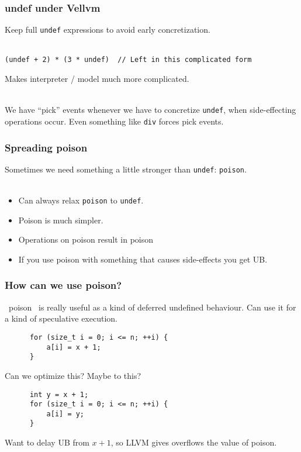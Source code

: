 \documentclass[handout]{beamer}
\begin{document}
\begin{frame}[fragile]
  \frametitle{undef under Vellvm}

  Keep full {\tt undef} expressions to avoid early concretization.\\~

\begin{lstlisting}
(undef + 2) * (3 * undef)  // Left in this complicated form
\end{lstlisting}

  Makes interpreter / model much more complicated. \\~

  We have ``pick'' events whenever we have to concretize {\tt undef},
  when side-effecting operations occur. Even something like {\tt div}
  forces pick events.

\end{frame}

\begin{frame}
  \frametitle{Spreading poison}

  Sometimes we need something a little stronger than {\tt undef}:
  {\tt poison}.\\~

  \begin{itemize}
  \item Can always relax {\tt poison} to {\tt undef}.
  \item Poison is much simpler.
  \item Operations on poison result in poison
  \item If you use poison with something that causes side-effects you
    get UB.
  \end{itemize}
\end{frame}

\begin{frame}[fragile]
  \frametitle{How can we use poison?}

  ~poison~ is really useful as a kind of deferred undefined
  behaviour. Can use it for a kind of speculative execution.

\begin{lstlisting}
      for (size_t i = 0; i <= n; ++i) {
          a[i] = x + 1;
      }
\end{lstlisting}

  Can we optimize this? \pause Maybe to this?

\begin{lstlisting}
      int y = x + 1;
      for (size_t i = 0; i <= n; ++i) {
          a[i] = y;
      }
\end{lstlisting}

  Want to delay UB from $x + 1$, so LLVM gives overflows the value of
  poison.
  
\end{frame}
\end{document}
